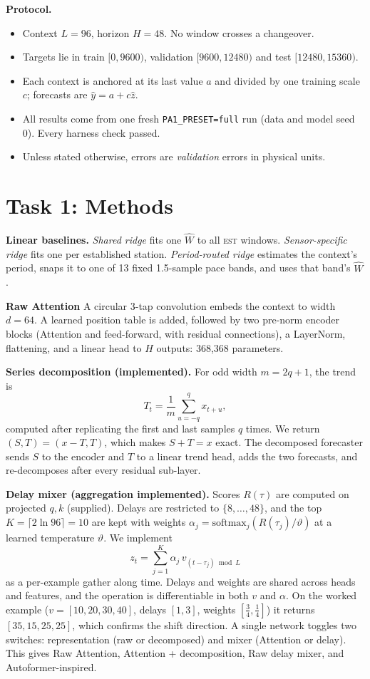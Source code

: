 \documentclass[11pt,a4paper]{article}
\newcommand{\code}[1]{\texttt{#1}}
\newcommand{\est}{\textsc{est}}   %
\begin{document}
\textbf{Protocol.}
\begin{itemize}
  \item Context $L=96$, horizon $H=48$. No window crosses a changeover.
  \item Targets lie in train $[0,9600)$, validation $[9600,12480)$ and test $[12480,15360)$.
  \item Each context is anchored at its last value $a$ and divided by one training scale $c$; forecasts are $\hat y=a+c\hat z$.
  \item All results come from one fresh \code{PA1\_PRESET=full} run (data and model seed 0). Every harness check passed.
  \item Unless stated otherwise, errors are \emph{validation} errors in physical units.
\end{itemize}

\section{Task 1: Methods}
\textbf{Linear baselines.} \emph{Shared ridge} fits one $\widehat W$ to all \est{} windows. \emph{Sensor-specific ridge} fits one per established station. \emph{Period-routed ridge} estimates the context's period, snaps it to one of 13 fixed 1.5-sample pace bands, and uses that band's $\widehat W$.

\noindent\textbf{Raw Attention} A circular 3-tap convolution embeds the context to width $d=64$. A learned position table is added, followed by two pre-norm encoder blocks (Attention and feed-forward, with residual connections), a LayerNorm, flattening, and a linear head to $H$ outputs: 368{,}368 parameters.

\noindent\textbf{Series decomposition (implemented).} For odd width $m=2q+1$, the trend is
\[
T_t=\frac{1}{m}\sum_{u=-q}^{q}x_{t+u},
\]
computed after replicating the first and last samples $q$ times. We return $(S,T)=(x-T,T)$, which makes $S+T=x$ exact. The decomposed forecaster sends $S$ to the encoder and $T$ to a linear trend head, adds the two forecasts, and re-decomposes after every residual sub-layer.

\noindent\textbf{Delay mixer (aggregation implemented).} Scores $R(\tau)$ are computed on projected $q,k$ (supplied). Delays are restricted to $\{8,\dots,48\}$, and the top $K=\lceil2\ln96\rceil=10$ are kept with weights $\alpha_j=\mathrm{softmax}_j(R(\tau_j)/\vartheta)$ at a learned temperature $\vartheta$. We implement
\begin{equation}
z_t=\sum_{j=1}^{K}\alpha_j\,v_{(t-\tau_j)\bmod L}
\label{eq:agg}
\end{equation}
as a per-example gather along time. Delays and weights are shared across heads and features, and the operation is differentiable in both $v$ and $\alpha$. On the worked example ($v=[10,20,30,40]$, delays $[1,3]$, weights $[\frac34,\frac14]$) it returns $[35,15,25,25]$, which confirms the shift direction. A single network toggles two switches: representation (raw or decomposed) and mixer (Attention or delay). This gives Raw Attention, Attention + decomposition, Raw delay mixer, and Autoformer-inspired. 
\end{document}
